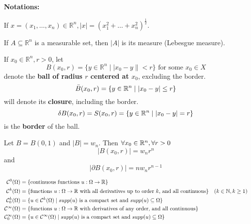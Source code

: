 \textbf{Notations:}

If $x = (x_1, \ldots, x_n) \in \mathbb{R}^n, |x| = (x_1^2 + \ldots + x_n^2)^\frac{1}{2}$. 

If \( A \subseteq \mathbb{R}^n\) is a measurable set, then \( |A|\) is its measure (Lebesgue measure).

\begin{DefBox}
    \begin{Def}
        If \( x_0 \in \mathbb{R}^n, r > 0 \), let
\[
B(x_0, r) = \{ y \in \mathbb{R}^n \mid |x_0 - y\| < r \} \text{ for some } x_0 \in X
\]
denote the \textbf{ball of radius \( r \) centered at \( x_0 \)}, excluding the border.
\begin{equation*}
    \Bar{B}(x_0, r) = \{y \in \mathbb{R}^n \mid |x_0 - y| \leq r\}
\end{equation*}
will denote its \textbf{closure}, including the border. 
\begin{equation*}
    \delta B (x_0,r)= S(x_0,r) = \{y \in \mathbb{R}^n \mid |x_0-y| = r\}
\end{equation*}
is the \textbf{border} of the ball. 
    \end{Def}
\end{DefBox}


Let \( B = B(0, 1) \) and \( |B| = w_n \). Then $\forall x_0 \in \mathbb{R}^n, \forall r > 0$
\begin{equation*}
    |B(x_0,r)| = w_n r^n
\end{equation*}
and 
\begin{equation*}
    |\partial B(x_0,r)| = n w_n r^{n-1}
\end{equation*}

\begin{DefBox}
    \begin{Def}
        \begin{equation*}
    \begin{split}
        \mathcal{C}^0(\Omega) &= \{\text{continuous functions } u: \Omega \rightarrow \mathbb{R}\}\\
        \mathcal{C}^k(\Omega) &= \{\text{functions } u: \Omega \rightarrow \mathbb{R} \text{ with all derivatives up to order $k$, and all continuous}\} \quad (k \in \mathbb{N}, k \geq 1)\\
        \mathcal{C}_0^k(\Omega) &= \{ u \in \mathcal{C}^k(\Omega) \mid supp(u) \text{ is a compact set and } supp(u) \subseteq \Omega\}\\
        \mathcal{C}^\infty(\Omega) &= \{\text{functions } u: \Omega \rightarrow \mathbb{R} \text{ with derivatives of any order, and all continuous}\}\\
        \mathcal{C}^\infty_0(\Omega) &= \{u \in \mathcal{C}^\infty(\Omega) \mid supp(u) \text{ is a compact set and } supp(u) \subseteq \Omega\}\\
    \end{split}
\end{equation*}
    \end{Def}
\end{DefBox}


